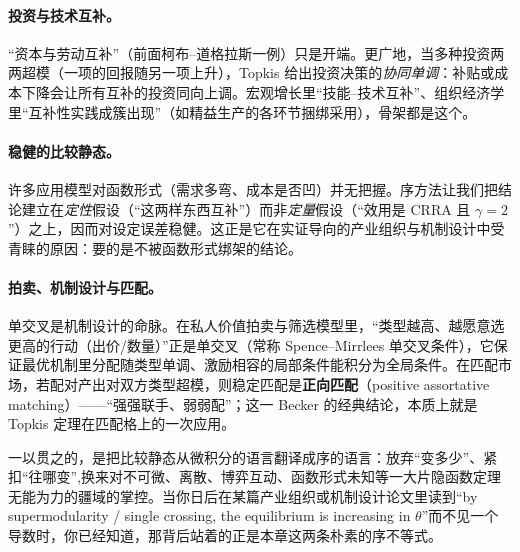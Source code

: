 \paragraph{投资与技术互补。}
``资本与劳动互补''（前面柯布--道格拉斯一例）只是开端。更广地，当多种投资两两超模（一项的回报随另一项上升），Topkis 给出投资决策的\emph{协同单调}：补贴或成本下降会让所有互补的投资同向上调。宏观增长里``技能--技术互补''、组织经济学里``互补性实践成簇出现''（如精益生产的各环节捆绑采用），骨架都是这个。

\paragraph{稳健的比较静态。}
许多应用模型对函数形式（需求多弯、成本是否凹）并无把握。序方法让我们把结论建立在\emph{定性}假设（``这两样东西互补''）而非\emph{定量}假设（``效用是 CRRA 且 $\gamma=2$''）之上，因而对设定误差稳健。这正是它在实证导向的产业组织与机制设计中受青睐的原因：要的是不被函数形式绑架的结论。

\paragraph{拍卖、机制设计与匹配。}
单交叉是机制设计的命脉。在私人价值拍卖与筛选模型里，``类型越高、越愿意选更高的行动（出价/数量）''正是单交叉（常称 Spence--Mirrlees 单交叉条件），它保证最优机制里分配随类型单调、激励相容的局部条件能积分为全局条件。在匹配市场，若配对产出对双方类型超模，则稳定匹配是\textbf{正向匹配}（positive assortative matching）——``强强联手、弱弱配''；这一 Becker 的经典结论，本质上就是 Topkis 定理在匹配格上的一次应用。

\medskip
一以贯之的，是把比较静态从微积分的语言翻译成序的语言：放弃``变多少''、紧扣``往哪变'',换来对不可微、离散、博弈互动、函数形式未知等一大片隐函数定理无能为力的疆域的掌控。当你日后在某篇产业组织或机制设计论文里读到``by supermodularity / single crossing, the equilibrium is increasing in $\theta$''而不见一个导数时，你已经知道，那背后站着的正是本章这两条朴素的序不等式。
